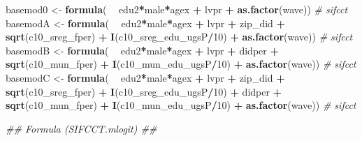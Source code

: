 \documentclass[
]{article}
\newenvironment{Shaded}{\begin{snugshade}}{\end{snugshade}}
\newcommand{\CommentTok}[1]{\textcolor[rgb]{0.56,0.35,0.01}{\textit{#1}}}
\newcommand{\DecValTok}[1]{\textcolor[rgb]{0.00,0.00,0.81}{#1}}
\newcommand{\KeywordTok}[1]{\textcolor[rgb]{0.13,0.29,0.53}{\textbf{#1}}}
\newcommand{\NormalTok}[1]{#1}
\newcommand{\OperatorTok}[1]{\textcolor[rgb]{0.81,0.36,0.00}{\textbf{#1}}}
\newcommand{\StringTok}[1]{\textcolor[rgb]{0.31,0.60,0.02}{#1}}
\begin{document}
\begin{Shaded}
\begin{Highlighting}[]
\NormalTok{basemod0 <-}\StringTok{ }\KeywordTok{formula}\NormalTok{(  }\OperatorTok{~}\StringTok{ }\NormalTok{edu2}\OperatorTok{*}\NormalTok{male}\OperatorTok{*}\NormalTok{agex }\OperatorTok{+}\StringTok{ }\NormalTok{lvpr }\OperatorTok{+}\StringTok{  }
\StringTok{                        }\KeywordTok{as.factor}\NormalTok{(wave)) }\CommentTok{# sifcct}
\NormalTok{basemodA <-}\StringTok{ }\KeywordTok{formula}\NormalTok{(  }\OperatorTok{~}\StringTok{ }\NormalTok{edu2}\OperatorTok{*}\NormalTok{male}\OperatorTok{*}\NormalTok{agex }\OperatorTok{+}\StringTok{ }\NormalTok{lvpr }\OperatorTok{+}\StringTok{  }
\StringTok{                        }\NormalTok{zip_did }\OperatorTok{+}\StringTok{ }\KeywordTok{sqrt}\NormalTok{(c10_sreg_fper) }\OperatorTok{+}\StringTok{ }\KeywordTok{I}\NormalTok{(c10_sreg_edu_ugsP}\OperatorTok{/}\DecValTok{10}\NormalTok{) }\OperatorTok{+}\StringTok{ }
\StringTok{                        }\KeywordTok{as.factor}\NormalTok{(wave)) }\CommentTok{# sifcct}
\NormalTok{basemodB <-}\StringTok{ }\KeywordTok{formula}\NormalTok{(  }\OperatorTok{~}\StringTok{ }\NormalTok{edu2}\OperatorTok{*}\NormalTok{male}\OperatorTok{*}\NormalTok{agex }\OperatorTok{+}\StringTok{ }\NormalTok{lvpr }\OperatorTok{+}\StringTok{  }
\StringTok{                        }\NormalTok{didper }\OperatorTok{+}\StringTok{ }\KeywordTok{sqrt}\NormalTok{(c10_mun_fper) }\OperatorTok{+}\StringTok{ }\KeywordTok{I}\NormalTok{(c10_mun_edu_ugsP}\OperatorTok{/}\DecValTok{10}\NormalTok{) }\OperatorTok{+}\StringTok{ }
\StringTok{                        }\KeywordTok{as.factor}\NormalTok{(wave)) }\CommentTok{# sifcct}
\NormalTok{basemodC <-}\StringTok{ }\KeywordTok{formula}\NormalTok{(  }\OperatorTok{~}\StringTok{ }\NormalTok{edu2}\OperatorTok{*}\NormalTok{male}\OperatorTok{*}\NormalTok{agex }\OperatorTok{+}\StringTok{ }\NormalTok{lvpr }\OperatorTok{+}\StringTok{  }
\StringTok{                        }\NormalTok{zip_did }\OperatorTok{+}\StringTok{ }\KeywordTok{sqrt}\NormalTok{(c10_sreg_fper) }\OperatorTok{+}\StringTok{ }\KeywordTok{I}\NormalTok{(c10_sreg_edu_ugsP}\OperatorTok{/}\DecValTok{10}\NormalTok{) }\OperatorTok{+}\StringTok{ }
\StringTok{                        }\NormalTok{didper }\OperatorTok{+}\StringTok{ }\KeywordTok{sqrt}\NormalTok{(c10_mun_fper) }\OperatorTok{+}\StringTok{ }\KeywordTok{I}\NormalTok{(c10_mun_edu_ugsP}\OperatorTok{/}\DecValTok{10}\NormalTok{) }\OperatorTok{+}\StringTok{ }
\StringTok{                        }\KeywordTok{as.factor}\NormalTok{(wave)) }\CommentTok{# sifcct}

\CommentTok{## Formula (SIFCCT.mlogit) ##}


\end{Highlighting}
\end{Shaded}
\end{document}
